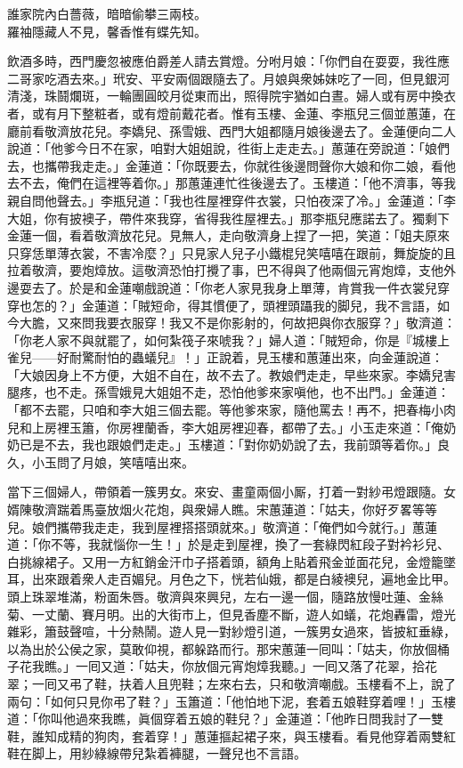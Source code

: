 \begin{myquote} 
誰家院內白薔薇，暗暗偷攀三兩枝。\\羅袖隱藏人不見，馨香惟有蝶先知。
\end{myquote} 

飲酒多時，西門慶忽被應伯爵差人請去賞燈。分咐月娘：「你們自在耍耍，我徃應二哥家吃酒去來。」玳安、平安兩個跟隨去了。月娘與衆姊妹吃了一囘，但見銀河清淺，珠鬪爛斑，一輪團圓皎月從東而出，照得院宇猶如白晝。婦人或有房中換衣者，或有月下整粧者，或有燈前戴花者。惟有玉樓、金蓮、李瓶兒三個並蕙蓮，在廳前看敬濟放花兒。李嬌兒、孫雪娥、西門大姐都隨月娘後邊去了。金蓮便向二人說道：「他爹今日不在家，咱對大姐姐說，徃街上走走去。」蕙蓮在旁說道：「娘們去，也攜帶我走走。」金蓮道：「你既要去，你就徃後邊問聲你大娘和你二娘，看他去不去，俺們在這裡等着你。」那蕙蓮連忙徃後邊去了。玉樓道：「他不濟事，等我親自問他聲去。」李瓶兒道：「我也徃屋裡穿件衣裳，只怕夜深了冷。」金蓮道：「李大姐，你有披襖子，帶件來我穿，省得我徃屋裡去。」{}那李瓶兒應諾去了。{}獨剩下金蓮一個，看着敬濟放花兒。見無人，走向敬濟身上捏了一把，{}笑道：「姐夫原來只穿恁單薄衣裳，不害冷麼？」只見家人兒子小鐵棍兒笑嘻嘻在跟前，舞旋旋的且拉着敬濟，要炮𤍤放。{}這敬濟恐怕打攪了事，巴不得與了他兩個元宵炮𤍤，支他外邊耍去了。於是和金蓮嘲戲說道：「你老人家見我身上單薄，肯賞我一件衣裳兒穿穿也怎的？」金蓮道：「賊短命，得其慣便了，頭裡頭躡我的脚兒，我不言語，如今大膽，又來問我要衣服穿！我又不是你影射的，何故把與你衣服穿？」敬濟道：「你老人家不與就罷了，如何紮筏子來唬我？」婦人道：「賊短命，你是『城樓上雀兒——好耐驚耐怕的蟲蟻兒』！」正說着，見玉樓和蕙蓮出來，向金蓮說道：「大娘因身上不方便，大姐不自在，故不去了。教娘們走走，早些來家。李嬌兒害腿疼，也不走。孫雪娥見大姐姐不走，恐怕他爹來家嗔他，也不出門。」金蓮道：「都不去罷，只咱和李大姐三個去罷。等他爹來家，隨他罵去！再不，把春梅小肉兒和上房裡玉簫，你房裡蘭香，李大姐房裡迎春，都帶了去。」小玉走來道：「俺奶奶已是不去，我也跟娘們走走。」玉樓道：「對你奶奶說了去，我前頭等着你。」良久，小玉問了月娘，笑嘻嘻出來。

當下三個婦人，帶領着一簇男女。來安、畫童兩個小厮，打着一對紗弔燈跟隨。女婿陳敬濟踹着馬臺放烟火花炮，與衆婦人瞧。宋蕙蓮道：「姑夫，你好歹畧等等兒。娘們攜帶我走走，我到屋裡搭搭頭就來。」敬濟道：「俺們如今就行。」蕙蓮道：「你不等，我就惱你一生！」{}於是走到屋裡，換了一套綠閃紅段子對衿衫兒、白挑線裙子。又用一方紅銷金汗巾子搭着頭，額角上貼着飛金並面花兒，金燈籠墜耳，出來跟着衆人走百媚兒。月色之下，恍若仙娥，都是白綾襖兒，遍地金比甲。頭上珠翠堆滿，粉面朱唇。敬濟與來興兒，左右一邊一個，隨路放慢吐蓮、金絲菊、一丈蘭、賽月明。出的大街市上，但見香塵不斷，遊人如蟻，花炮轟雷，燈光雜彩，簫鼓聲喧，十分熱鬧。遊人見一對紗燈引道，一簇男女過來，皆披紅垂綠，以為出於公侯之家，莫敢仰視，都躲路而行。那宋蕙蓮一囘叫：「姑夫，你放個桶子花我瞧。」一囘又道：「姑夫，你放個元宵炮𤍤我聽。」一囘又落了花翠，拾花翠；一囘又弔了鞋，扶着人且兜鞋；左來右去，只和敬濟嘲戲。{}玉樓看不上，說了兩句：「如何只見你弔了鞋？」玉簫道：「他怕地下泥，套着五娘鞋穿着哩！」{}玉樓道：「你叫他過來我瞧，眞個穿着五娘的鞋兒？」金蓮道：「他昨日問我討了一雙鞋，誰知成精的狗肉，套着穿！」蕙蓮摳起裙子來，與玉樓看。看見他穿着兩雙紅鞋在脚上，用紗綠線帶兒紮着褲腿，一聲兒也不言語。


